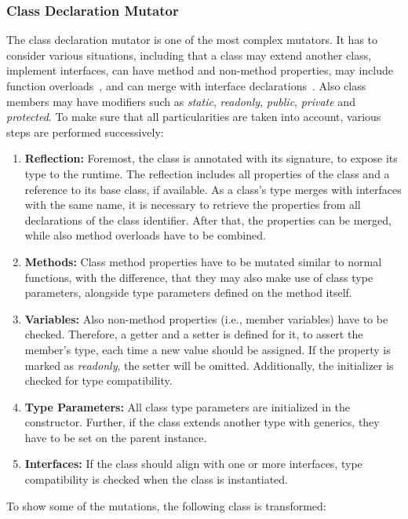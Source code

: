 \subsubsection{Class Declaration Mutator}

The class declaration mutator is one of the most complex mutators. It has to consider various situations, including that a class may extend another class, implement interfaces, can have method and non-method properties, may include function overloads~\cite{TypeScriptHandbook:Functions}, and can merge with interface declarations~\cite{TypeScriptHandbook:DeclarationMerging}. Also class members may have modifiers such as \emph{static}, \emph{readonly}, \emph{public}, \emph{private} and \emph{protected}. To make sure that all particularities are taken into account, various steps are performed successively:
\begin{enumerate}
  \item \textbf{Reflection:} Foremost, the class is annotated with its signature, to expose its type to the runtime. The reflection includes all properties of the class and a reference to its base class, if available. As a class's type merges with interfaces with the same name, it is necessary to retrieve the properties from all declarations of the class identifier. After that, the properties can be merged, while also method overloads have to be combined. %
  \item \textbf{Methods:} Class method properties have to be mutated similar to normal functions, with the difference, that they may also make use of class type parameters, alongside type parameters defined on the method itself.
  \item \textbf{Variables:} Also non-method properties (i.e., member variables) have to be checked. Therefore, a getter and a setter is defined for it, to assert the member's type, each time a new value should be assigned. If the property is marked as \emph{readonly}, the setter will be omitted. Additionally, the initializer is checked for type compatibility.
  \item \textbf{Type Parameters:} All class type parameters are initialized in the constructor. Further, if the class extends another type with generics, they have to be set on the parent instance.
  \item \textbf{Interfaces:} If the class should align with one or more interfaces, type compatibility is checked when the class is instantiated.
\end{enumerate}
To show some of the mutations, the following class is transformed:
